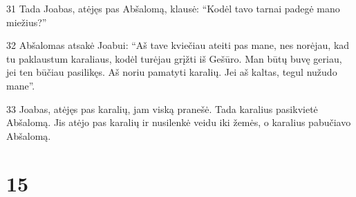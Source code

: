 \par 31 Tada Joabas, atėjęs pas Abšalomą, klausė: “Kodėl tavo tarnai padegė mano miežius?” 
\par 32 Abšalomas atsakė Joabui: “Aš tave kviečiau ateiti pas mane, nes norėjau, kad tu paklaustum karaliaus, kodėl turėjau grįžti iš Gešūro. Man būtų buvę geriau, jei ten būčiau pasilikęs. Aš noriu pamatyti karalių. Jei aš kaltas, tegul nužudo mane”. 
\par 33 Joabas, atėjęs pas karalių, jam viską pranešė. Tada karalius pasikvietė Abšalomą. Jis atėjo pas karalių ir nusilenkė veidu iki žemės, o karalius pabučiavo Abšalomą.



\chapter{15}

